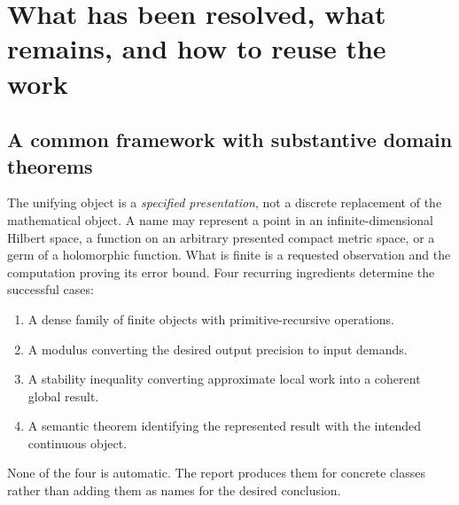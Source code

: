 \section{What has been resolved, what remains, and how to reuse the work}
\label{sec:synthesis}

\subsection{A common framework with substantive domain theorems}

The unifying object is a \emph{specified presentation}, not a discrete
replacement of the mathematical object. A name may represent a point in an
infinite-dimensional Hilbert space, a function on an arbitrary presented
compact metric space, or a germ of a holomorphic function. What is finite
is a requested observation and the computation proving its error bound.
Four recurring ingredients determine the successful cases:
\begin{enumerate}
\item A dense family of finite objects with primitive-recursive operations.
\item A modulus converting the desired output precision to input demands.
\item A stability inequality converting approximate local work into a
coherent global result.
\item A semantic theorem identifying the represented result with the
intended continuous object.
\end{enumerate}
None of the four is automatic. The report produces them for concrete
classes rather than adding them as names for the desired conclusion.

